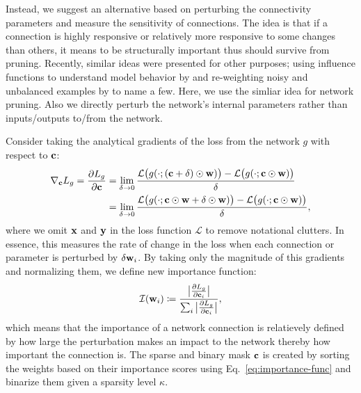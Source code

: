 {Instead, we suggest an alternative based on perturbing the connectivity parameters and measure the sensitivity of connections.
The idea is that if a connection is highly responsive or relatively more responsive to some changes than others, it means to be structurally important thus should survive from pruning.
Recently, similar ideas were presented for other purposes; using influence functions to understand model behavior by \cite{koh2017understanding} and re-weighting noisy and unbalanced examples by \cite{ren2018learning} to name a few.
Here, we use the simliar idea for network pruning.
Also we directly perturb the network's internal parameters rather than inputs/outputs to/from the network.

Consider taking the analytical gradients of the loss from the network $g$ with respect to ${\mathbf{c}}$:
\begin{equation}
    \begin{aligned}
        \nabla_{{\mathbf{c}}} L_g = \frac{\partial L_g}{\partial {\mathbf{c}}} & = \lim_{\delta \to 0} \frac{\mathcal{L}\big( g(\cdot; ({\mathbf{c}} + \delta) \odot {\mathbf{w}}) \big) - \mathcal{L}\big(g(\cdot; {\mathbf{c}} \odot {\mathbf{w}})\big)}{\delta} \\
        & = \lim_{\delta \to 0} \frac{\mathcal{L}\big( g(\cdot; {\mathbf{c}} \odot {\mathbf{w}} + \delta \odot {\mathbf{w}}) \big) - \mathcal{L}\big(g(\cdot; {\mathbf{c}} \odot {\mathbf{w}})\big)}{\delta},
    \end{aligned}
    \label{eq:grad-wrt-c}
\end{equation}
where we omit ${\mathbf{x}}$ and ${\mathbf{y}}$ in the loss function $\mathcal{L}$ to remove notational clutters.
In essence, this measures the rate of change in the loss when each connection or parameter is perturbed by $\delta {\mathbf{w}}_i$.
By taking only the magnitude of this gradients and normalizing them, we define new importance function:
\begin{equation}
    \mathcal{I}({\mathbf{w}}_i) \coloneqq \frac{\big| \frac{\partial L_g}{\partial {\mathbf{c}}_i} \big|}{\sum_{i} \big| \frac{\partial L_g}{\partial {\mathbf{c}}_i} \big|},
    \label{eq:importance-func}
\end{equation}
which means that the importance of a network connection is relatievely defined by how large the perturbation makes an impact to the network thereby how important the connection is.
The sparse and binary mask ${\mathbf{c}}$ is created by sorting the weights based on their importance scores using Eq.~\ref{eq:importance-func} and binarize them given a sparsity level $\kappa$. 

}
